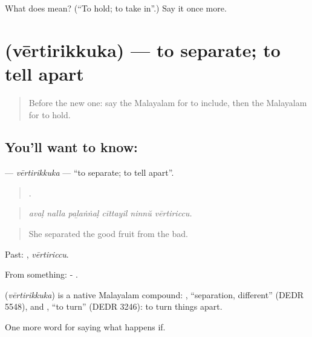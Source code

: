 \begin{tcolorbox}[breakable,colback=teal!4,colframe=teal!35!black,title={Before you move on}]
What does  mean? (\textquotedblleft{}To hold; to take in\textquotedblright{}.) Say it once more.
\end{tcolorbox}
\section[\texorpdfstring{\ml{വേർതിരിക്കുക} (vērtirikkuka)}{വേർതിരിക്കുക (vērtirikkuka)}]{ (vērtirikkuka) — to separate; to tell apart}

\label{lesson:ML-C456-vertirikkuka}



\begin{quote}
Before the new one: say the Malayalam for to include, then the Malayalam for to hold.
\end{quote}

\subsection*{You'll want to know: }
\textbf{} — \emph{vērtirikkuka} — \textquotedblleft{}to separate; to tell apart\textquotedblright{}.

\begin{quote}
     .
\end{quote}

\begin{quote}
\emph{avaḷ nalla paḻaṅṅaḷ cīttayil ninnŭ vērtiriccu.}
\end{quote}

\begin{quote}
She separated the good fruit from the bad.
\end{quote}

Past: , \emph{vērtiriccu}.

From something: -  .

\begin{cousinweb}
\textbf{} (\emph{vērtirikkuka}) is a native Malayalam compound: , \textquotedblleft{}separation, different\textquotedblright{} (DEDR 5548), and , \textquotedblleft{}to turn\textquotedblright{} (DEDR 3246): to turn things apart.
\end{cousinweb}

\begin{grammarlens}[title={What you've built}]
One more word for saying what happens if.
\end{grammarlens}

